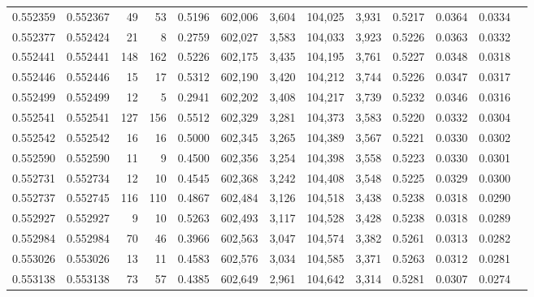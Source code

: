 \begin{tabular}{rrrrrrrrrrrrr}
0.552359 & 0.552367 &    49 &    53 &                                     0.5196 & 602,006 &   3,604 & 104,025 &   3,931 & 0.5217 & 0.0364 & 0.0334 \\
0.552377 & 0.552424 &    21 &     8 &                                     0.2759 & 602,027 &   3,583 & 104,033 &   3,923 & 0.5226 & 0.0363 & 0.0332 \\
0.552441 & 0.552441 &   148 &   162 &                                     0.5226 & 602,175 &   3,435 & 104,195 &   3,761 & 0.5227 & 0.0348 & 0.0318 \\
0.552446 & 0.552446 &    15 &    17 &                                     0.5312 & 602,190 &   3,420 & 104,212 &   3,744 & 0.5226 & 0.0347 & 0.0317 \\
0.552499 & 0.552499 &    12 &     5 &                                     0.2941 & 602,202 &   3,408 & 104,217 &   3,739 & 0.5232 & 0.0346 & 0.0316 \\
0.552541 & 0.552541 &   127 &   156 &                                     0.5512 & 602,329 &   3,281 & 104,373 &   3,583 & 0.5220 & 0.0332 & 0.0304 \\
0.552542 & 0.552542 &    16 &    16 &                                     0.5000 & 602,345 &   3,265 & 104,389 &   3,567 & 0.5221 & 0.0330 & 0.0302 \\
0.552590 & 0.552590 &    11 &     9 &                                     0.4500 & 602,356 &   3,254 & 104,398 &   3,558 & 0.5223 & 0.0330 & 0.0301 \\
0.552731 & 0.552734 &    12 &    10 &                                     0.4545 & 602,368 &   3,242 & 104,408 &   3,548 & 0.5225 & 0.0329 & 0.0300 \\
0.552737 & 0.552745 &   116 &   110 &                                     0.4867 & 602,484 &   3,126 & 104,518 &   3,438 & 0.5238 & 0.0318 & 0.0290 \\
0.552927 & 0.552927 &     9 &    10 &                                     0.5263 & 602,493 &   3,117 & 104,528 &   3,428 & 0.5238 & 0.0318 & 0.0289 \\
0.552984 & 0.552984 &    70 &    46 &                                     0.3966 & 602,563 &   3,047 & 104,574 &   3,382 & 0.5261 & 0.0313 & 0.0282 \\
0.553026 & 0.553026 &    13 &    11 &                                     0.4583 & 602,576 &   3,034 & 104,585 &   3,371 & 0.5263 & 0.0312 & 0.0281 \\
0.553138 & 0.553138 &    73 &    57 &                                     0.4385 & 602,649 &   2,961 & 104,642 &   3,314 & 0.5281 & 0.0307 & 0.0274 \\

\end{tabular}
